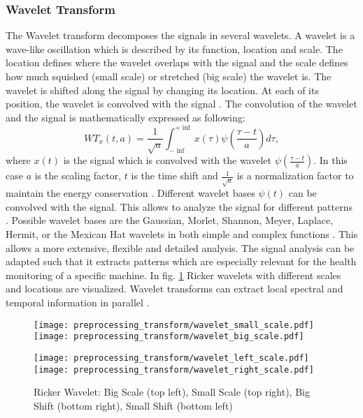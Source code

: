 \subsubsection{Wavelet Transform}
The Wavelet transform decomposes the signals in several wavelets. A wavelet is a wave-like oscillation which is described by its function, location and scale. The location defines where the wavelet overlaps with the signal and the scale defines how much squished (small scale) or stretched (big scale) the wavelet is. The wavelet is shifted along the signal by changing its location. At each of its position, the wavelet is convolved with the signal \cite{Shawhin2020}. The convolution of the wavelet and the signal is mathematically expressed as following:
\begin{equation}
    WT_{x}(t,a) = \frac{1}{\sqrt{a}} \int_{- \inf}^{+ \inf} x(\tau) \psi(\frac{\tau -t}{a}) d \tau,
\end{equation}
 where $x(t)$ is the signal which is convolved with the wavelet $\psi(\frac{\tau -t}{a})$. In this case $a$ is the scaling factor, $t$ is the time shift and $\frac{1}{\sqrt{a}}$ is a normalization factor to maintain the energy conservation \cite{FENG2013}. Different wavelet bases $\psi(t)$ can be convolved with the signal. This allows to analyze the signal for different patterns \cite{Shawhin2020}. Possible wavelet bases are the Gaussian, Morlet, Shannon, Meyer, Laplace, Hermit, or the Mexican Hat wavelets in both simple and complex functions \cite{Verstraete2017}. This allows a more extensive, flexible and detailed analysis. The signal analysis can be adapted such that it extracts patterns which are especially relevant for the health monitoring of a specific machine. In fig. \ref{fig:ricker_wavelet} Ricker wavelets with different scales and locations are visualized. Wavelet transforms can extract local spectral and temporal information in parallel \cite{Shawhin2020}.


\begin{figure}[H]
  \centering
  \texttt{[image: preprocessing\_transform/wavelet\_small\_scale.pdf]}
  \hspace{.1cm}
  \texttt{[image: preprocessing\_transform/wavelet\_big\_scale.pdf]}
  
  \vspace{.1cm}
  
  \texttt{[image: preprocessing\_transform/wavelet\_left\_scale.pdf]}
  \hspace{.1cm}
  \texttt{[image: preprocessing\_transform/wavelet\_right\_scale.pdf]}

  \caption{Ricker Wavelet: Big Scale (top left), Small Scale (top right), Big Shift (bottom right), Small Shift (bottom left)}
  \label{fig:ricker_wavelet}
\end{figure}

